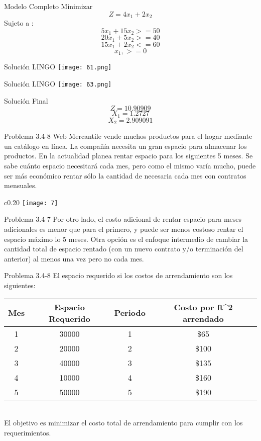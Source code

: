 \documentclass{beamer}
\begin{document}
\begin{frame}[fragile]{Modelo Completo}
Minimizar\\
\[Z = 4x_{1} + 2x_{2}\]
Sujeto a :\\
\[5x_{1} + 15x_{2} >= 50\]
\[20x_{1} +5x_{2} >= 40\]
\[15x_{1} + 2x_{2} <= 60\]
\[x_{1}, >= 0\]
\end{frame}

\begin{frame}[fragile]{Solución LINGO}
    \texttt{[image: 61.png]}
\end{frame}
\begin{frame}[fragile]{Solución LINGO}
    \texttt{[image: 63.png]}
\end{frame}

\begin{frame}[fragile]{Solución Final}
\[Z = 10.90909\]
\[X_{1} = 1.2727\]
\[X_{2} = 2.909091\]
\end{frame}

\begin{frame}[t,fragile]{Problema 3.4-8 }
Web Mercantile vende muchos productos para el hogar mediante un catálogo en línea. La compañía  necesita un gran espacio para almacenar los productos. En la actualidad planea rentar espacio para los siguientes 5 meses. Se sabe cuánto espacio necesitará cada mes, pero como el mismo varía mucho, puede ser más económico rentar sólo la cantidad  de necesaria cada mes con contratos mensuales.
\begin{wrapfigure}{c}{0.20\textwidth}
    \centering
    \texttt{[image: 7]}
\end{wrapfigure}
\end{frame}
\begin{frame}[t,fragile]{Problema 3.4-7}
Por otro lado, el costo adicional de rentar espacio para meses adicionales es menor que para el primero, y puede ser menos costoso rentar el espacio máximo lo 5 meses. Otra opción es el enfoque intermedio de cambiar la cantidad total de  espacio rentado (con un nuevo contrato y/o terminación del anterior) al menos una vez pero no cada mes.
\end{frame}

\begin{frame}[t,fragile]{Problema 3.4-8 }
El espacio requerido si los costos de arrendamiento son los siguientes:
\begin{tabular}{|c|c|c|c|}
\hline 
Mes & Espacio Requerido & Periodo & Costo por ft^2 arrendado \\ 
\hline 
1 & 30000 & 1 & \$65 \\ 
\hline 
2 & 20000 & 2 & \$100 \\ 
\hline 
3 & 40000 & 3 & \$135 \\ 
\hline 
4 & 10000 & 4 & \$160 \\ 
\hline 
5 & 50000 & 5 & \$190 \\ 
\hline 
\end{tabular} \\
El objetivo es minimizar el costo total de arrendamiento para cumplir con los requerimientos.
\end{frame}
\end{document}
